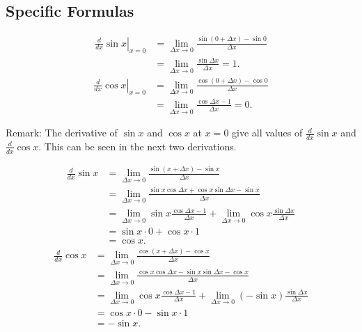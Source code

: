 \subsection{Specific Formulas}
\begin{align*}
    \left. \frac{d}{dx} \sin x \right\rvert_{ x = 0}
        & = \lim_{\Delta x \to 0}
            \frac{\sin(0 + \Delta x) - \sin 0}{\Delta x} \\
        & = \lim_{\Delta x \to 0}
            \frac{\sin \Delta x}{\Delta x}
          = 1.
\end{align*}
\begin{align*}
    \left. \frac{d}{dx} \cos x \right\rvert_{ x = 0}
        & = \lim_{\Delta x \to 0}
            \frac{\cos(0 + \Delta x) - \cos 0}{\Delta x} \\
        & = \lim_{\Delta x \to 0}
            \frac{\cos \Delta x - 1}{\Delta x}
          = 0.
\end{align*}

Remark: The derivative of \( \sin x \) and \( \cos x \) at \( x = 0 \)
give all values of \( \frac{d}{dx} \sin x \) and \( \frac{d}{dx} \cos x
\). This can be seen in the next two derivations.

\begin{align*}
    \frac{d}{dx} \sin x
        & = \lim_{\Delta x \to 0}
            \frac{\sin (x + \Delta x) - \sin x}{\Delta x} \\
        & = \lim_{\Delta x \to 0}
            \frac{\sin x \cos \Delta x + \cos x \sin \Delta x - \sin x}
                 {\Delta x} \\
        & = \lim_{\Delta x \to 0}
            \sin x \frac{\cos \Delta x - 1}{\Delta x} +
            \lim_{\Delta x \to 0}
            \cos x \frac{\sin \Delta x}{\Delta x} \\
        & = \sin x \cdot 0 + \cos x \cdot 1 \\
        & = \cos x.
\end{align*}
\begin{align*}
    \frac{d}{dx} \cos x
        & = \lim_{\Delta x \to 0}
            \frac{\cos (x + \Delta x) - \cos x}{\Delta x} \\
        & = \lim_{\Delta x \to 0}
            \frac{\cos x \cos \Delta x - \sin x \sin \Delta x - \cos x}
                 {\Delta x} \\
        & = \lim_{\Delta x \to 0}
            \cos x \frac{\cos \Delta x - 1}{\Delta x} +
            \lim_{\Delta x \to 0}
            (- \sin x) \frac{\sin \Delta x}{\Delta x} \\
        & = \cos x \cdot 0 - \sin x \cdot 1 \\
        & = - \sin x.
\end{align*}


